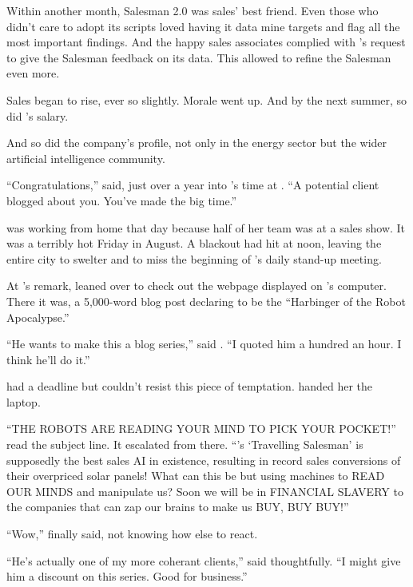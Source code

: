 \bigbreak

Within another month, Salesman 2.0 was sales' best friend. Even those who didn't care to adopt its scripts loved having it data mine targets and flag all the most important findings. And the happy sales associates complied with {\protag}'s request to give the Salesman feedback on its data. This allowed {\protag} to refine the Salesman even more.

Sales began to rise, ever so slightly. Morale went up. And by the next summer, so did {\protag}'s salary.

And so did the company's profile, not only in the energy sector but the wider artificial intelligence community.

``Congratulations,'' {\sidetag} said, just over a year into {\protag}'s time at {\energyCompany}. ``A potential client blogged about you. You've made the big time.''

{\protag} was working from home that day because half of her team was at a sales show. It was a terribly hot Friday in August. A blackout had hit \crunchyCity{} at noon, leaving the entire city to swelter and {\protag} to miss the beginning of {\energyCompany}'s daily stand-up meeting.

At {\sidetag}'s remark, {\protag} leaned over to check out the webpage displayed on {\sidetag}'s computer. There it was, a 5,000-word blog post declaring {\energyCompany} to be the ``Harbinger of the Robot Apocalypse.''

``He wants to make this a blog series,'' said {\sidetag}. ``I quoted him a hundred an hour. I think he'll do it.''

{\protag} had a deadline but couldn't resist this piece of temptation. {\sidetag} handed her the laptop.

``THE ROBOTS ARE READING YOUR MIND TO PICK YOUR POCKET!'' read the subject line. It escalated from there. ``{\energyCompany}'s `Travelling Salesman' is supposedly the best sales AI in existence, resulting in record sales conversions of their overpriced solar panels! What can this be but using machines to READ OUR MINDS and manipulate us? Soon we will be in FINANCIAL SLAVERY to the companies that can zap our brains to make us BUY, BUY BUY!''

``Wow,'' {\protag} finally said, not knowing how else to react.

``He's actually one of my more coherant clients,'' {\sidetag} said thoughtfully. ``I might give him a discount on this series. Good for business.''

